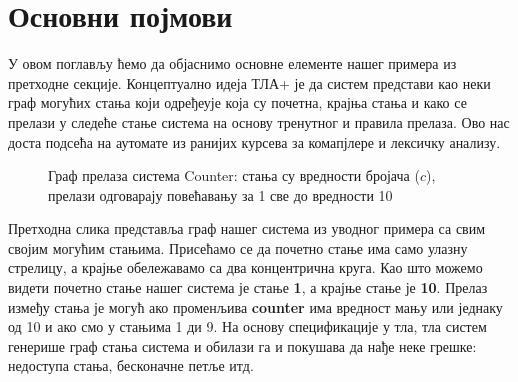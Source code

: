 \section{Основни појмови}
У овом поглављу ћемо да објаснимо основне елементе нашег примера из претходне секције.
Концептуално идеја ТЛА+ је да систем представи као неки граф могућих стања који одређеује
која су почетна, крајња стања и како се прелази у следеће стање система на основу тренутног и правила прелаза.
Ово нас доста подсећа на аутомате из ранијих курсева за комапјлере и лексичку анализу.

\begin{figure}[H]
    \centering
    \caption{Граф прелаза система Counter: стања су вредности бројача ($c$), прелази одговарају повећавању за 1 све до вредности 10}
\end{figure}
Претходна слика представља граф нашег система  из уводног примера са свим својим могућим стањима. Присећамо се да
почетно стање има само улазну стрелицу, а крајње обележавамо са два концентрична круга. Као што можемо видети почетно стање
нашег система је стање \textbf{1}, а крајње стање је \textbf{10}. Прелаз између стања је могућ ако променљива \textbf{counter}
има вредност мању или једнаку од 10 и ако смо у стањима 1 ди 9. На основу спецификације у тла, тла систем генерише граф стања
система и обилази га и покушава да нађе неке грешке: недоступа стања, бесконачне петље итд.


